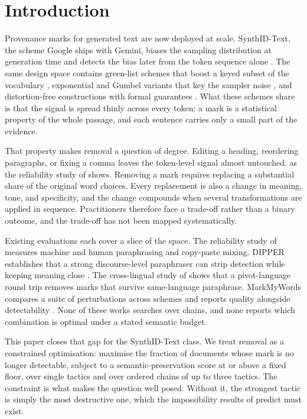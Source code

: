 \section{Introduction}
\label{sec:intro}

Provenance marks for generated text are now deployed at scale. SynthID-Text, the scheme Google ships with Gemini, biases the sampling distribution at generation time and detects the bias later from the token sequence alone \citep{synthidtext}. The same design space contains green-list schemes that boost a keyed subset of the vocabulary \citep{kgw}, exponential and Gumbel variants that key the sampler noise \citep{kuditipudi}, and distortion-free constructions with formal guarantees \citep{christ}. What these schemes share is that the signal is spread thinly across every token: a mark is a statistical property of the whole passage, and each sentence carries only a small part of the evidence.

That property makes removal a question of degree. Editing a heading, reordering paragraphs, or fixing a comma leaves the token-level signal almost untouched, as the reliability study of \citet{kgwreliability} shows. Removing a mark requires replacing a substantial share of the original word choices. Every replacement is also a change in meaning, tone, and specificity, and the change compounds when several transformations are applied in sequence. Practitioners therefore face a trade-off rather than a binary outcome, and the trade-off has not been mapped systematically.

Existing evaluations each cover a slice of the space. The reliability study of \citet{kgwreliability} measures machine and human paraphrasing and copy-paste mixing. DIPPER establishes that a strong discourse-level paraphraser can strip detection while keeping meaning close \citep{dipper}. The cross-lingual study of \citet{cwra} shows that a pivot-language round trip removes marks that survive same-language paraphrase. MarkMyWords compares a suite of perturbations across schemes and reports quality alongside detectability \citep{markmywords}. None of these works searches over chains, and none reports which combination is optimal under a stated semantic budget.

This paper closes that gap for the SynthID-Text class. We treat removal as a constrained optimisation: maximise the fraction of documents whose mark is no longer detectable, subject to a semantic-preservation score at or above a fixed floor, over single tactics and over ordered chains of up to three tactics. The constraint is what makes the question well posed. Without it, the strongest tactic is simply the most destructive one, which the impossibility results of \citet{sand} predict must exist.

